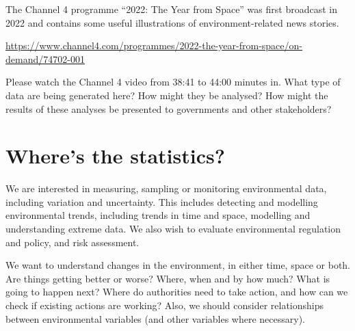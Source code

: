 \documentclass[
  letterpaper,
  DIV=11,
  numbers=noendperiod]{scrartcl}
\begin{document}
\begin{tcolorbox}[enhanced jigsaw, opacityback=0, coltitle=black, opacitybacktitle=0.6, breakable, toprule=.15mm, bottomtitle=1mm, title={Channel 4 programme ``2022: The Year from Space''}, colback=white, leftrule=.75mm, titlerule=0mm, toptitle=1mm, arc=.35mm, bottomrule=.15mm, rightrule=.15mm, colframe=quarto-callout-note-color-frame, colbacktitle=quarto-callout-note-color!10!white, left=2mm]

The Channel 4 programme ``2022: The Year from Space'' was first
broadcast in 2022 and contains some useful illustrations of
environment-related news stories.

\url{https://www.channel4.com/programmes/2022-the-year-from-space/on-demand/74702-001}

\end{tcolorbox}

\begin{tcolorbox}[enhanced jigsaw, opacityback=0, coltitle=black, opacitybacktitle=0.6, breakable, toprule=.15mm, bottomtitle=1mm, title={Exercise 2}, colback=white, leftrule=.75mm, titlerule=0mm, toptitle=1mm, arc=.35mm, bottomrule=.15mm, rightrule=.15mm, colframe=quarto-callout-tip-color-frame, colbacktitle=quarto-callout-tip-color!10!white, left=2mm]

Please watch the Channel 4 video from 38:41 to 44:00 minutes in. What
type of data are being generated here? How might they be analysed? How
might the results of these analyses be presented to governments and
other stakeholders?

\end{tcolorbox}

\section{Where's the statistics?}\label{wheres-the-statistics}

We are interested in measuring, sampling or monitoring environmental
data, including variation and uncertainty. This includes detecting and
modelling environmental trends, including trends in time and space,
modelling and understanding extreme data. We also wish to evaluate
environmental regulation and policy, and risk assessment.

We want to understand changes in the environment, in either time, space
or both. Are things getting better or worse? Where, when and by how
much? What is going to happen next? Where do authorities need to take
action, and how can we check if existing actions are working? Also, we
should consider relationships between environmental variables (and other
variables where necessary).
\end{document}
